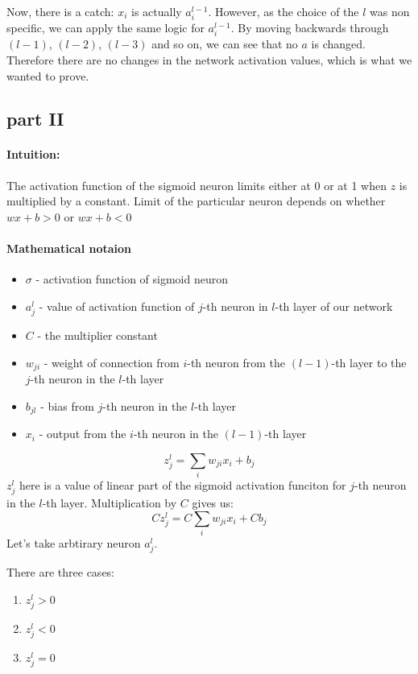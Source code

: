 \documentclass{article}
\begin{document}
Now, there is a catch: $x_i$ is actually $a_{i}^{l-1}$. 
However, as the choice of the $l$ was non specific, we can apply the same logic for $a_{i}^{l-1}$.
By moving backwards through $(l-1)$, $(l-2)$, $(l-3)$ and so on, we can see that no $a$ is changed. 
Therefore there are no changes in the network activation values, which is what we wanted to prove.

\subsection{part II}
\paragraph{Intuition:} 
The activation function of the sigmoid neuron limits either at 0 or at 1 when $z$
is multiplied by a constant. Limit of the particular neuron depends on whether $wx + b > 0$ or $wx + b < 0$
\paragraph{Mathematical notaion} 

\begin{itemize}
\item $\sigma$ - activation function of sigmoid neuron
\item $a_{j}^l$ - value of activation function of $j$-th neuron in $l$-th layer of our network
\item $C$ -  the multiplier constant
\item $w_{ji}$ - weight of connection from $i$-th neuron from the $(l-1)$-th layer to the $j$-th neuron in the $l$-th layer 
\item $b_{jl}$ - bias from $j$-th neuron in the $l$-th layer
\item $x_i$ - output from the $i$-th neuron in the $(l-1)$-th layer
\end{itemize}

\begin{equation*}
z_{j}^l = \sum_{i}w_{ji}x_i + b_j 
\end{equation*}
$z_{j}^l$ here is a value of linear part of the sigmoid activation funciton for $j$-th neuron in the $l$-th layer.
Multiplication by $C$ gives us:
\begin{equation*}
Cz_{j}^l = C\sum_{i}w_{ji}x_i + Cb_j
\end{equation*}
Let's take arbtirary neuron $a_j^l$.

There are three cases:
\begin{enumerate}
\item $z_j^l > 0$
\item $z_j^l < 0$
\item $z_j^l = 0$
\end{enumerate}
\end{document}
